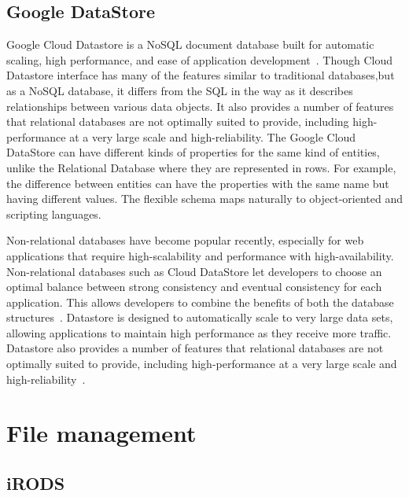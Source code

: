      \pv


\subsection{Google DataStore}

Google Cloud Datastore is a NoSQL document database built for
automatic scaling, high performance, and ease of application
development~\cite{www-google-datastore}. Though Cloud Datastore
interface has many of the features similar to traditional
databases,but as a NoSQL database, it differs from the SQL in the way
as it describes relationships between various data objects. It also
provides a number of features that relational databases are not
optimally suited to provide, including high-performance at a very
large scale and high-reliability. The Google Cloud DataStore can have
different kinds of properties for the same kind of entities, unlike
the Relational Database where they are represented in rows. For
example, the difference between entities can have the properties with
the same name but having different values. The flexible schema maps
naturally to object-oriented and scripting languages.

Non-relational databases have become popular recently, especially for
web applications that require high-scalability and performance with
high-availability. Non-relational databases such as Cloud DataStore
let developers to choose an optimal balance between strong consistency
and eventual consistency for each application. This allows developers
to combine the benefits of both the database
structures~\cite{www-google-datastore-2}.  Datastore is designed to
automatically scale to very large data sets, allowing applications to
maintain high performance as they receive more traffic. Datastore also
provides a number of features that relational databases are not
optimally suited to provide, including high-performance at a very
large scale and high-reliability~\cite{www-google-datastore}.

\section{File management}
\label{S:o-file-management}


\subsection{iRODS}

